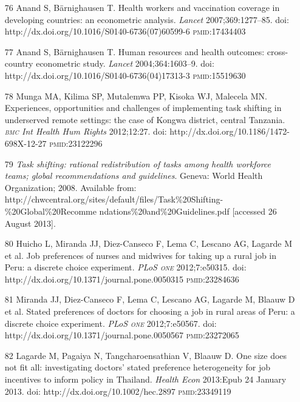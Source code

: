 \documentclass{article}
\begin{document}
\begin{itemize}
\item[76] Anand S, Bärnighausen T. Health workers and vaccination coverage in
developing
countries: an econometric analysis. \textit{Lancet}
2007;369:1277–85. doi:
http://dx.doi.org/10.1016/S0140-6736(07)60599-6 \textsc{pmid}:17434403

\item[77] Anand S, Bärnighausen T. Human resources and health outcomes:
cross-country
econometric study. \textit{Lancet}
2004;364:1603–9. doi:
http://dx.doi.org/10.1016/S0140-6736(04)17313-3 \textsc{pmid}:15519630

\item[78] Munga MA, Kilima SP, Mutalemwa PP, Kisoka WJ, Malecela MN.
Experiences,
opportunities and challenges of implementing task shifting in underserved remote
settings: the case
of Kongwa district, central Tanzania. \textit{\textsc{bmc} Int Health Hum Rights}
2012;12:27. doi:
http://dx.doi.org/10.1186/1472-698X-12-27 \textsc{pmid}:23122296

\item[79] \textit{Task shifting: rational redistribution of tasks among health
workforce
teams; global recommendations and guidelines}. Geneva: World Health Organization; 2008.
Available from:
http://chwcentral.org/sites/default/files/Task\%20Shifting-\%20Global\%20Recomme
ndations\%20and\%20Guidelines.pdf
[accessed 26 August 2013].

\item[80] Huicho L, Miranda JJ, Diez-Canseco F, Lema C, Lescano AG, Lagarde M et
al. Job
preferences of nurses and midwives for taking up a rural job in Peru: a discrete
choice experiment.
\textit{PLoS \textsc{one}}
2012;7:e50315. doi: http://dx.doi.org/10.1371/journal.pone.0050315
\textsc{pmid}:23284636

\item[81] Miranda JJ, Diez-Canseco F, Lema C, Lescano AG, Lagarde M, Blaauw D et
al. Stated
preferences of doctors for choosing a job in rural areas of Peru: a discrete
choice experiment.
\textit{PLoS \textsc{one}}
2012;7:e50567. doi: http://dx.doi.org/10.1371/journal.pone.0050567
\textsc{pmid}:23272065

\item[82] Lagarde M, Pagaiya N, Tangcharoensathian V, Blaauw D. One size does
not fit all:
investigating doctors’ stated preference heterogeneity for job incentives to
inform policy in
Thailand. \textit{Health Econ}
2013:Epub 24 January 2013. doi:
http://dx.doi.org/10.1002/hec.2897 \textsc{pmid}:23349119

\end{itemize}
\end{document}
